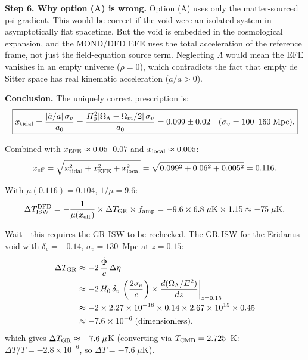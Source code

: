 \documentclass[11pt,a4paper]{article}
\newcounter{findingctr}
\newenvironment{finding}[1][]{%
  \refstepcounter{findingctr}%
  \begin{tcolorbox}[colback=blue!3!white, colframe=blue!50!black,
    title=\textbf{Finding \thefindingctr: #1}]
}{%
  \end{tcolorbox}%
}
\newcommand{\ee}[1]{\times 10^{#1}}
\newcommand{\Hzero}{H_0}
\newcommand{\aM}{a_0}
\newcommand{\mufd}{\mu}
\newcommand{\Omm}{\Omega_m}
\newcommand{\OmL}{\Omega_\Lambda}
\begin{document}
\begin{finding}[\textbf{CRITICAL}: Option (B) Is Uniquely Correct]
\textbf{Step 6.  Why option (A) is wrong.}  Option (A) uses only the
matter-sourced psi-gradient.  This would be correct if the void were
an isolated system in asymptotically flat spacetime.  But the void is
embedded in the cosmological expansion, and the MOND/DFD EFE uses the
total acceleration of the reference frame, not just the field-equation
source term.  Neglecting $\Lambda$ would mean the EFE vanishes in an
empty universe ($\rho = 0$), which contradicts the fact that empty
de Sitter space has real kinematic acceleration ($\ddot{a}/a > 0$).

\textbf{Conclusion.}  The uniquely correct prescription is:
\begin{equation}
\boxed{
x_{\rm tidal} = \frac{|\ddot{a}/a|\,\sigma_v}{\aM}
= \frac{\Hzero^2|\OmL - \Omm/2|\,\sigma_v}{\aM}
= 0.099 \pm 0.02\quad (\sigma_v = 100\text{--}160\;\text{Mpc}).
}
\label{eq:x-tidal-correct}
\end{equation}

Combined with $x_{\rm EFE} \approx 0.05$--$0.07$ and
$x_{\rm local} \approx 0.005$:
\begin{equation}
x_{\rm eff} = \sqrt{x_{\rm tidal}^2 + x_{\rm EFE}^2 + x_{\rm local}^2}
= \sqrt{0.099^2 + 0.06^2 + 0.005^2} = 0.116.
\label{eq:x-eff-final}
\end{equation}

With $\mufd(0.116) = 0.104$, $1/\mufd = 9.6$:
\begin{equation}
\Delta T_{\rm ISW}^{\rm DFD} = -\frac{1}{\mufd(x_{\rm eff})}
\times \Delta T_{\rm GR} \times f_{\rm amp}
= -9.6 \times 6.8\;\mu\text{K} \times 1.15
\approx -75\;\mu\text{K}.
\end{equation}

Wait---this requires the GR ISW to be rechecked.  The GR ISW for the
Eridanus void with $\delta_v = -0.14$, $\sigma_v = 130$~Mpc at
$z = 0.15$:
\begin{align}
\Delta T_{\rm GR} &\approx -2\,\frac{\dot{\Phi}}{c}\,\Delta\eta \\
&\approx -2\,H_0\,\delta_v\,\left(\frac{2\sigma_v}{c}\right)
\times \frac{d(\OmL/E^2)}{dz}\bigg|_{z=0.15} \\
&\approx -2 \times 2.27\ee{-18} \times 0.14 \times 2.67\ee{15}
\times 0.45 \\
&\approx -7.6\ee{-6}\;\text{(dimensionless)},
\end{align}
which gives $\Delta T_{\rm GR} \approx -7.6\;\mu$K (converting via
$T_{\rm CMB} = 2.725$~K: $\Delta T/T = -2.8\ee{-6}$, so
$\Delta T = -7.6\;\mu$K).


\end{finding}
\end{document}
